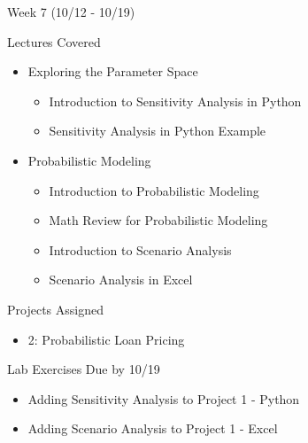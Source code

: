 \documentclass[]{article}
\begin{document}
\begin{section}{Week 7 (10/12 - 10/19)}
\begin{subsection}{Lectures Covered}
\begin{itemize}
\item Exploring the Parameter Space
\begin{itemize}
\item Introduction to Sensitivity Analysis in Python
\item Sensitivity Analysis in Python Example
\end{itemize}
\end{itemize}
\begin{itemize}
\item Probabilistic Modeling
\begin{itemize}
\item Introduction to Probabilistic Modeling
\item Math Review for Probabilistic Modeling
\item Introduction to Scenario Analysis
\item Scenario Analysis in Excel
\end{itemize}
\end{itemize}
\end{subsection}
\begin{subsection}{Projects Assigned}
\begin{itemize}
\item 2: Probabilistic Loan Pricing
\end{itemize}
\end{subsection}
\begin{subsection}{Lab Exercises Due by 10/19}
\begin{itemize}
\item Adding Sensitivity Analysis to Project 1 - Python
\item Adding Scenario Analysis to Project 1 - Excel
\end{itemize}
\end{subsection}
\end{section}
\end{document}
